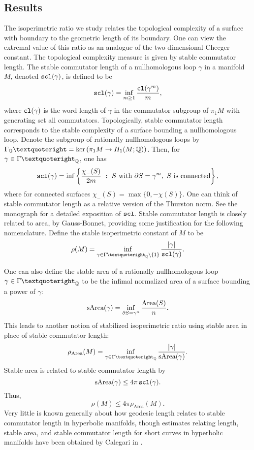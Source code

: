 {\subsection{Results}
The isoperimetric ratio we study relates the topological complexity of a surface with boundary to the geometric length of its boundary. One can view the extremal value of this ratio as an analogue of the two-dimensional Cheeger constant. The topological complexity measure is given by stable commutator length. The stable commutator length of a nullhomologous loop $\gamma$ in a manifold $M$, denoted $\operatorname{{\tt{scl}}}(\gamma)$, is defined to be \[\operatorname{{\tt{scl}}}(\gamma) = \inf\limits_{m\geq 1}\frac{{\tt{cl}}(\gamma ^{m})}{m},\] where ${\tt{cl}}(\gamma)$ is the word length of $\gamma$ in the commutator subgroup of $\pi_1M$ with generating set all commutators. Topologically, stable commutator length corresponds to the stable complexity of a surface bounding a nullhomologous loop. Denote the subgroup of rationally nullhomologous loops by $\Gamma_{\Q}’ = \ker\left(\pi_1M\to H_1(M;\Q)\right)$.
Then, for $\gamma\in \Gamma’_{\Q}$, one has $$\operatorname{{\tt{scl}}}(\gamma) = \inf\left\{\frac{\chi_-(S)}{2m}~:~S \text{ with }\partial S = \gamma^m,~S\text{ is connected}\right\},$$ where for connected surfaces $\chi_-(S) = \max\{0,-\chi(S)\}$. One can think of stable commutator length as a relative version of the Thurston norm. See the monograph \cite{Calegari} for a detailed exposition of $\operatorname{{\tt{scl}}}$.
Stable commutator length is closely related to area, by Gauss-Bonnet, providing some justification for the following nomenclature. Define the stable isoperimetric constant of $M$ to be \[\rho(M) = \inf\limits_{\gamma\in \Gamma’_\Q\setminus\{1\}}\frac{|\gamma|}{\scl(\gamma)}.\]

One can also define the stable area of a rationally nullhomologous loop $\gamma\in \Gamma’_{\Q}$ to be the infimal normalized area of a surface bounding a power of $\gamma$: $$\text{sArea}(\gamma) = \inf\limits_{\partial S = \gamma^n}\frac{\text{Area}(S)}{n}.$$ This leads to another notion of stabilized isoperimetric ratio using stable area in place of stable commutator length: $$\rho_{\text{Area}}(M) = \inf\limits_{\gamma\in\Gamma’_{\Q}}\frac{|\gamma|}{\text{sArea}(\gamma)}.$$
Stable area is related to stable commutator length by $$\text{sArea}(\gamma) \leq 4\pi\operatorname{{\tt{scl}}}(\gamma).$$ Thus, $$\rho(M) \leq 4\pi \rho_{\text{Area}}(M).$$
Very little is known generally about how geodesic length relates to stable commutator length in hyperbolic manifolds, though estimates relating length, stable area, and stable commutator length for short curves in hyperbolic manifolds have been obtained by Calegari in \cite{length}.

}

